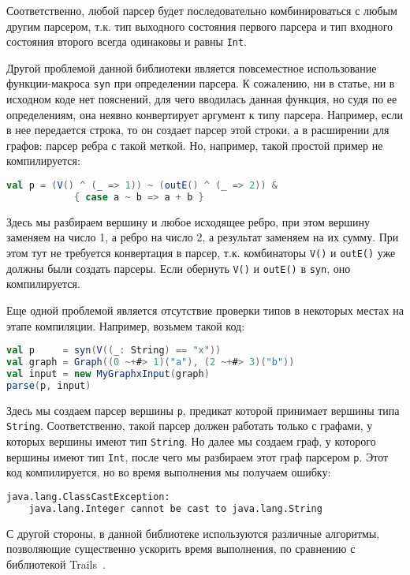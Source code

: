 Соответственно, любой парсер будет последовательно комбинироваться с любым другим парсером, т.к. тип выходного состояния первого парсера и тип входного состояния второго всегда одинаковы и равны \verb|Int|.

Другой проблемой данной библиотеки является повсеместное использование функции-макроса \verb|syn| при определении парсера.
К сожалению, ни в статье, ни в исходном коде нет пояснений, для чего вводилась данная функция, но судя по ее определениям, она неявно конвертирует аргумент к типу парсера. Например, если в нее передается строка, то он создает парсер этой строки, а в расширении для графов: парсер ребра с такой меткой.
Но, например, такой простой пример не компилируется:
\begin{lstlisting}[language=Scala, numbers=none, frame=none]
val p = (V() ^ (_ => 1)) ~ (outE() ^ (_ => 2)) &
            { case a ~ b => a + b }
\end{lstlisting}
Здесь мы разбираем вершину и любое исходящее ребро, при этом вершину заменяем на число 1, а ребро на число 2, а результат заменяем на их сумму.
При этом тут не требуется конвертация в парсер, т.к. комбинаторы \verb|V()| и \verb|outE()| уже должны были создать парсеры. Если обернуть \verb|V()| и \verb|outE()| в \verb|syn|, оно компилируется.

Еще одной проблемой является отсутствие проверки типов в некоторых местах на этапе компиляции.
Например, возьмем такой код:

\begin{nobreaks}
\begin{lstlisting}[language=Scala, numbers=none, frame=none]
val p     = syn(V((_: String) == "x"))
val graph = Graph((0 ~+#> 1)("a"), (2 ~+#> 3)("b"))
val input = new MyGraphxInput(graph)
parse(p, input)
\end{lstlisting}
\end{nobreaks}

Здесь мы создаем парсер вершины \verb|p|, предикат которой принимает вершины типа \verb|String|.
Соответственно, такой парсер должен работать только с графами, у которых вершины имеют тип \verb|String|.
Но далее мы создаем граф, у которого вершины имеют тип \verb|Int|, после чего мы разбираем этот граф парсером \verb|p|.
Этот код компилируется, но во время выполнения мы получаем ошибку:
\begin{lstlisting}[language=TeX]
java.lang.ClassCastException: 
    java.lang.Integer cannot be cast to java.lang.String
\end{lstlisting}

С другой стороны, в данной библиотеке используются различные алгоритмы, позволяющие существенно ускорить время выполнения, по сравнению с библиотекой Trails~\cite{MeerkatGraphs}. 

